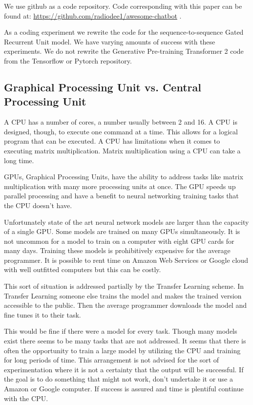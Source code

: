 We use github as a code repository. Code corresponding with this paper can be found at: \href{https://github.com/radiodee1/awesome-chatbot}{https://github.com/radiodee1/awesome-chatbot}
. 

As a coding experiment we rewrite the code for the sequence-to-sequence Gated Recurrent Unit model. We have varying amounts of success with these experiments. We do not rewrite the Generative Pre-training Transformer 2 code from the Tensorflow or Pytorch repository.

\subsection{Graphical Processing Unit vs. Central Processing Unit}

A CPU has a number of cores, a number usually between 2 and 16. A CPU is designed, though, to execute one command at a time. This allows for a logical program that can be executed. A CPU has limitations when it comes to executing matrix multiplication. Matrix multiplication using a CPU can take a long time.

GPUs, Graphical Processing Units, have the ability to address tasks like matrix multiplication with many more processing units at once. The GPU speeds up parallel processing and have a benefit to neural networking training tasks that the CPU doesn't have.

Unfortunately state of the art neural network models are larger than the capacity of a single GPU. Some models are trained on many GPUs simultaneously. It is not uncommon for a model to train on a computer with eight GPU cards for many days. Training these models is prohibitively expensive for the average programmer. It is possible to rent time on Amazon Web Services or Google cloud with well outfitted computers but this can be costly.

This sort of situation is addressed partially by the Transfer Learning scheme. In Transfer Learning someone else trains the model and makes the trained version accessible to the public. Then the average programmer downloads the model and fine tunes it to their task.

This would be fine if there were a model for every task. Though many models exist there seems to be many tasks that are not addressed. It seems that there is often the opportunity to train a large model by utilizing the CPU and training for long periods of time. This arrangement is not advised for the sort of experimentation where it is not a certainty that the output will be successful. If the goal is to do something that might not work, don't undertake it or use a Amazon or Google computer. If success is assured and time is plentiful continue with the CPU.

